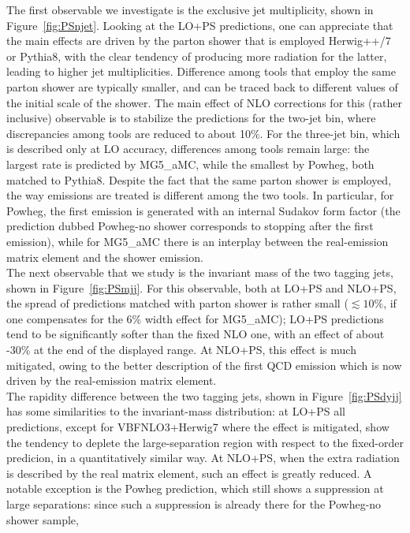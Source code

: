The first observable we investigate is the exclusive jet multiplicity, shown in Figure~\ref{fig:PSnjet}. Looking at the LO+PS predictions, one can appreciate that the
main effects are driven by the parton shower that is employed {\sc Herwig++/7} or {\sc Pythia8}, with the clear tendency of producing more radiation for the latter, 
leading to higher jet multiplicities. Difference among tools that employ the same parton shower are typically smaller, and can be traced back to different values of the
initial scale of the shower. The main effect of NLO corrections for this (rather inclusive) observable is to stabilize the predictions for the two-jet bin, where discrepancies 
among tools are reduced to about 10\%. For the three-jet bin, which is described only at LO accuracy, differences among tools remain large: the largest rate is predicted by
{\sc MG5\_aMC}, while the smallest by {\sc Powheg}, both matched to {\sc Pythia8}. Despite the fact that the same parton shower is employed, the way emissions are treated
is different among the two tools. In particular, for {\sc Powheg}, the first emission is generated with an internal Sudakov form factor (the
prediction dubbed {\sc Powheg-no shower} corresponds to stopping after the first emission), while for {\sc MG5\_aMC} there is an
interplay between the real-emission matrix element and the shower emission. \\
The next observable that we study is the invariant mass of the two tagging jets, shown in Figure~\ref{fig:PSmjj}. For this observable, both at LO+PS and NLO+PS,
the spread of predictions matched with parton shower is rather small
($\lesssim 10\%$, if one compensates for the 6\% width effect for {\sc MG5\_aMC}); LO+PS predictions tend to be significantly softer than the fixed NLO one, with an effect of 
about -30\% at the end of the displayed range. At NLO+PS, this effect is much mitigated, owing to the better description of the first QCD emission which is now driven by  
 the real-emission matrix element.\\
The rapidity difference between the two tagging jets, shown in Figure~\ref{fig:PSdyjj} has some similarities to the invariant-mass distribution: at LO+PS all predictions, 
except for {\sc VBFNLO3+Herwig7} where the effect is mitigated, show the tendency to deplete the large-separation region with respect to the fixed-order predicion, in a 
quantitatively similar way. At NLO+PS, when the extra radiation is described by the real matrix element, such an effect is greatly reduced. A notable 
exception is the {\sc Powheg} prediction, which still shows a suppression at large separations: since such a suppression is already there for the {\sc Powheg-no shower} sample,
